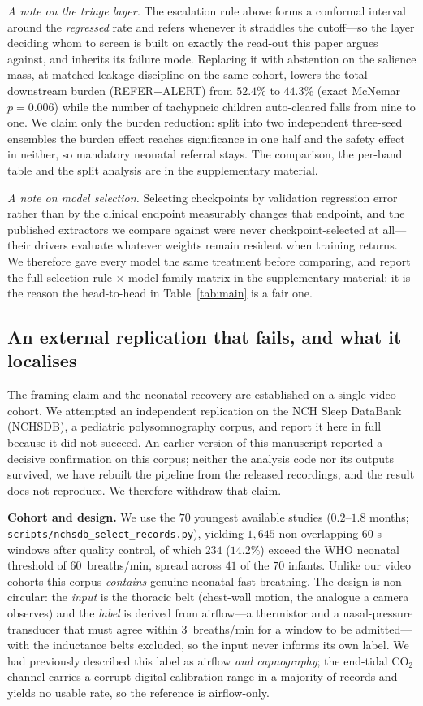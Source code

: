 \documentclass[journal]{IEEEtran}
\begin{document}
\emph{A note on the triage layer.} The escalation rule above forms a conformal interval around the
\emph{regressed} rate and refers whenever it straddles the cutoff---so the layer deciding whom to screen
is built on exactly the read-out this paper argues against, and inherits its failure mode. Replacing it
with abstention on the salience mass, at matched leakage discipline on the same cohort, lowers the total
downstream burden (REFER${+}$ALERT) from $52.4\%$ to $44.3\%$ (exact McNemar $p=0.006$) while the number
of tachypneic children auto-cleared falls from nine to one. We claim only the burden reduction: split
into two independent three-seed ensembles the burden effect reaches significance in one half and the
safety effect in neither, so mandatory neonatal referral stays. The comparison, the per-band table and
the split analysis are in the supplementary material.

\emph{A note on model selection.} Selecting checkpoints by validation regression error rather than by
the clinical endpoint measurably changes that endpoint, and the published extractors we compare against
were never checkpoint-selected at all---their drivers evaluate whatever weights remain resident when
training returns. We therefore gave every model the same treatment before comparing, and report the full
selection-rule $\times$ model-family matrix in the supplementary material; it is the reason the
head-to-head in Table~\ref{tab:main} is a fair one.

\subsection{An external replication that fails, and what it localises}\label{sec:extval}
The framing claim and the neonatal recovery are established on a single video cohort. We attempted an
independent replication on the NCH Sleep DataBank (NCHSDB), a pediatric polysomnography corpus, and
report it here in full because it did not succeed. An earlier version of this manuscript reported a
decisive confirmation on this corpus; neither the analysis code nor its outputs survived, we have
rebuilt the pipeline from the released recordings, and the result does not reproduce. We therefore
withdraw that claim.

\textbf{Cohort and design.} We use the $70$ youngest available studies ($0.2$--$1.8$ months;
\texttt{scripts/nchsdb\_select\_records.py}), yielding $1{,}645$ non-overlapping $60$-s windows after
quality control, of which $234$ ($14.2\%$) exceed the WHO neonatal threshold of $60$~breaths/min,
spread across $41$ of the $70$ infants. Unlike our video cohorts this corpus \emph{contains} genuine
neonatal fast breathing. The design is non-circular: the \emph{input} is the thoracic belt (chest-wall
motion, the analogue a camera observes) and the \emph{label} is derived from airflow---a thermistor and
a nasal-pressure transducer that must agree within $3$~breaths/min for a window to be admitted---with
the inductance belts excluded, so the input never informs its own label. We had previously described
this label as airflow \emph{and capnography}; the end-tidal CO$_2$ channel carries a corrupt digital
calibration range in a majority of records and yields no usable rate, so the reference is airflow-only.
\end{document}
